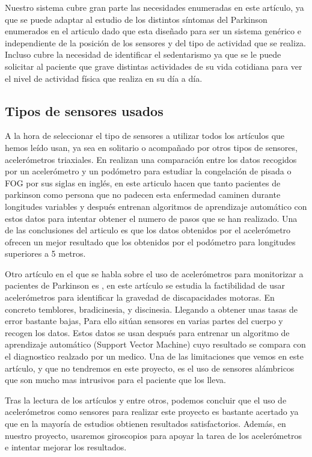 \documentclass[11pt,spanish]{article}
\begin{document}
Nuestro sistema cubre gran parte las necesidades enumeradas en este artículo, ya que se puede adaptar al estudio de los distintos síntomas del Parkinson enumerados en el articulo dado que esta diseñado para ser un sistema genérico e independiente de la posición de los sensores y del tipo de actividad que se realiza. Incluso cubre la necesidad de identificar el sedentarismo ya que se le puede solicitar al paciente que grave distintas actividades de su vida cotidiana para ver el nivel de actividad física que realiza en su día a día.
\newline

\subsection{Tipos de sensores usados}
A la hora de seleccionar el tipo de sensores a utilizar todos los artículos que hemos leído usan, ya sea en solitario o acompañado por otros tipos de sensores, acelerómetros triaxiales. En \cite{resumen3} realizan una comparación entre los datos recogidos por un acelerómetro y un podómetro para estudiar la congelación de pisada o FOG por sus siglas en inglés, en este articulo hacen que tanto pacientes de parkinson como persona que no padecen esta enfermedad caminen durante longitudes variables y después entrenan algoritmos de aprendizaje automático con estos datos para intentar obtener el numero de pasos que se han realizado. Una de las conclusiones del articulo es que los datos obtenidos por el acelerómetro ofrecen un mejor resultado que los obtenidos por el podómetro para longitudes superiores a 5 metros. 
\newline

Otro artículo en el que se habla sobre el uso de acelerómetros para monitorizar a pacientes de Parkinson es \cite{resumen4}, en este artículo se estudia la factibilidad de usar acelerómetros para identificar la gravedad de discapacidades motoras. En concreto temblores, bradicinesia, y discinesia. Llegando a obtener unas tasas de error bastante bajas, Para ello sitúan sensores en varias partes del cuerpo y recogen los datos. Estos datos se usan después para entrenar un algoritmo de aprendizaje automático (Support Vector Machine) cuyo resultado se compara con el diagnostico realzado por un medico. Una de las limitaciones que vemos en este artículo, y que no tendremos en este proyecto, es el uso de sensores alámbricos que son mucho mas intrusivos para el paciente que los lleva.

Tras la lectura de los artículos \cite{resumen3} y \cite{resumen4} entre otros, podemos concluir que el uso de acelerómetros como sensores para realizar este proyecto es bastante acertado ya que en la mayoría de estudios obtienen resultados satisfactorios. Además, en nuestro proyecto, usaremos giroscopios para apoyar la tarea de los acelerómetros e intentar mejorar los resultados.
\end{document}
